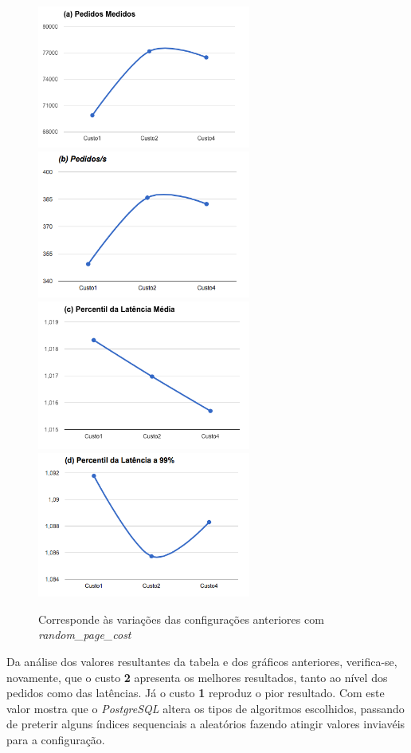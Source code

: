 \begin{figure}[ht!]
\centering
\includegraphics[width=70mm]{img/questao_3/sb_ecs_cs_vacuum_rpc_a.png}
\includegraphics[width=70mm]{img/questao_3/sb_ecs_cs_vacuum_rpc_b.png}
\includegraphics[width=70mm]{img/questao_3/sb_ecs_cs_vacuum_rpc_c.png}
\includegraphics[width=70mm]{img/questao_3/sb_ecs_cs_vacuum_rpc_d.png}
\caption{Corresponde às variações das configurações anteriores com \textit{random\_page\_cost}}
\end{figure}

Da análise dos valores resultantes da tabela e dos gráficos anteriores, verifica-se, novamente, que o custo \textbf{2} apresenta os melhores resultados, tanto ao nível dos pedidos como das latências. Já o custo \textbf{1} reproduz o pior resultado. Com este valor mostra que o \textit{PostgreSQL} altera os tipos de algoritmos escolhidos, passando de preterir alguns índices sequenciais a aleatórios fazendo atingir valores inviavéis para a configuração.


